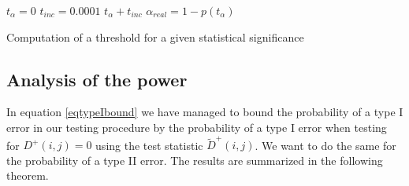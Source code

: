 \documentclass[a4paper,12pt]{article}
\theoremstyle{plain}
\theoremstyle{definition}
\theoremstyle{remark}
\begin{document}
\begin{algorithm}[H]
	$t_\alpha = 0$\;
	$t_{inc} = 0.0001$\;
	{
		$t_\alpha + t_{inc}$\;
		$\alpha_{real} = 1 - p(t_\alpha)$\;
	}
	\caption{Computation of a threshold for a given statistical significance}
\end{algorithm}

\newpage

\subsection{Analysis of the power}

In equation \eqref{eqtypeIbound} we have managed to bound the probability of a type I error in our testing procedure by the probability of a type I error when testing for $D^+(i, j) = 0$ using the test statistic $\tilde{D}^+(i, j)$. We want to do the same for the probability of a type II error. The results are summarized in the following theorem.
\end{document}
